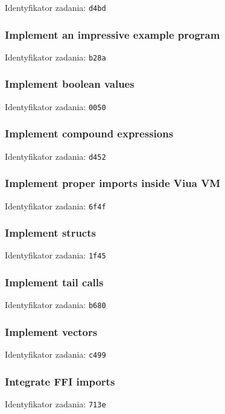 Identyfikator zadania: \texttt{d4bd}

\subsubsection{Implement an impressive example program}

Identyfikator zadania: \texttt{b28a}

\subsubsection{Implement boolean values}

Identyfikator zadania: \texttt{0050}

\subsubsection{Implement compound expressions}

Identyfikator zadania: \texttt{d452}

\subsubsection{Implement proper imports inside Viua VM}

Identyfikator zadania: \texttt{6f4f}

\subsubsection{Implement structs}

Identyfikator zadania: \texttt{1f45}

\subsubsection{Implement tail calls}

Identyfikator zadania: \texttt{b680}

\subsubsection{Implement vectors}

Identyfikator zadania: \texttt{c499}

\subsubsection{Integrate FFI imports}

Identyfikator zadania: \texttt{713e}

